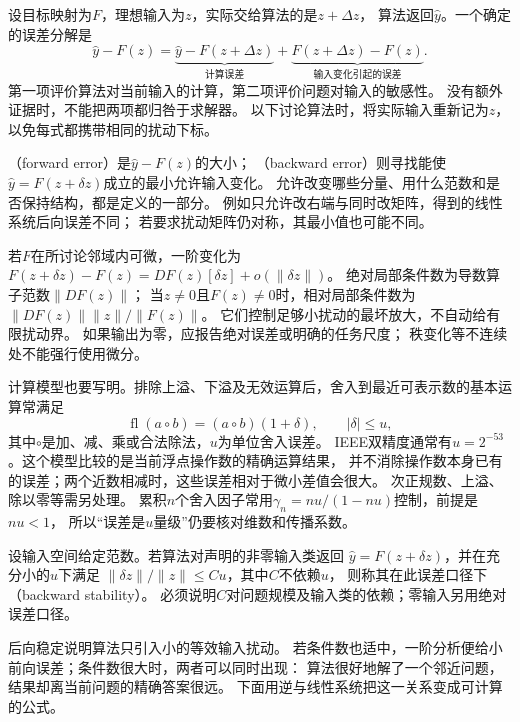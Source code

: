 设目标映射为$F$，理想输入为$z$，实际交给算法的是$z+\Delta z$，
算法返回$\widehat y$。一个确定的误差分解是
\[
 \widehat y-F(z)
 =\underbrace{\widehat y-F(z+\Delta z)}_{\text{计算误差}}
  +\underbrace{F(z+\Delta z)-F(z)}_{\text{输入变化引起的误差}}.
\]
第一项评价算法对当前输入的计算，第二项评价问题对输入的敏感性。
没有额外证据时，不能把两项都归咎于求解器。
以下讨论算法时，将实际输入重新记为$z$，以免每式都携带相同的扰动下标。

（forward error）是$\widehat y-F(z)$的大小；
（backward error）则寻找能使
$\widehat y=F(z+\delta z)$成立的最小允许输入变化。
允许改变哪些分量、用什么范数和是否保持结构，都是定义的一部分。
例如只允许改右端与同时改矩阵，得到的线性系统后向误差不同；
若要求扰动矩阵仍对称，其最小值也可能不同。

若$F$在所讨论邻域内可微，一阶变化为
$F(z+\delta z)-F(z)=DF(z)[\delta z]+o(\lVert\delta z\rVert)$。
绝对局部条件数为导数算子范数$\lVert DF(z)\rVert$；
当$z\neq0$且$F(z)\neq0$时，相对局部条件数为
$\lVert DF(z)\rVert\lVert z\rVert/\lVert F(z)\rVert$。
它们控制足够小扰动的最坏放大，不自动给有限扰动界。
如果输出为零，应报告绝对误差或明确的任务尺度；
秩变化等不连续处不能强行使用微分。

计算模型也要写明。排除上溢、下溢及无效运算后，舍入到最近可表示数的基本运算常满足
\begin{equation}
 \operatorname{fl}(a\mathbin\circ b)
 =(a\mathbin\circ b)(1+\delta),\qquad |\delta|\leq u,
 \label{eq:ch06-floating-point-model}
\end{equation}
其中$\circ$是加、减、乘或合法除法，$u$为单位舍入误差。
IEEE双精度通常有$u=2^{-53}$。这个模型比较的是当前浮点操作数的精确运算结果，
并不消除操作数本身已有的误差；两个近数相减时，这些误差相对于微小差值会很大。
次正规数、上溢、除以零等需另处理。
累积$n$个舍入因子常用$\gamma_n=nu/(1-nu)$控制，前提是$nu<1$，
所以“误差是$u$量级”仍要核对维数和传播系数。

\begin{definition}[范数意义下的后向稳定]
\label{def:matrix-analysis-backward-stability}
设输入空间给定范数。若算法对声明的非零输入类返回
$\widehat y=F(z+\delta z)$，并在充分小的$u$下满足
$\lVert\delta z\rVert/\lVert z\rVert\leq C u$，其中$C$不依赖$u$，
则称其在此误差口径下（backward stability）。
必须说明$C$对问题规模及输入类的依赖；零输入另用绝对误差口径。
\end{definition}
后向稳定说明算法只引入小的等效输入扰动。
若条件数也适中，一阶分析便给小前向误差；条件数很大时，两者可以同时出现：
算法很好地解了一个邻近问题，结果却离当前问题的精确答案很远。
下面用逆与线性系统把这一关系变成可计算的公式。

